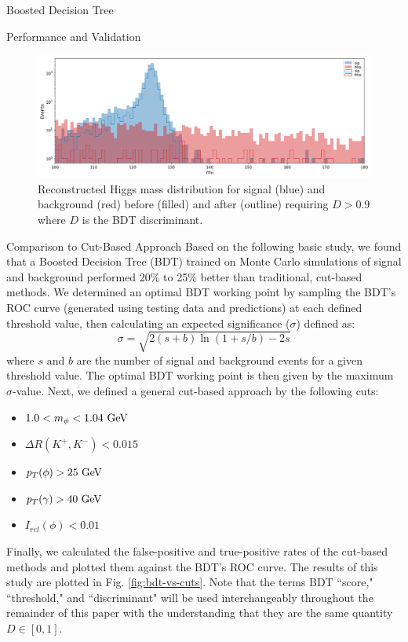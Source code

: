 \begin{section}{Boosted Decision Tree}
\begin{subsection}{Performance and Validation}
\begin{figure}[htb]
\begin{center}
\includegraphics[width=.95\linewidth]{Dissertation/fig/bdt-bkgsculpt2.png}
\end{center}
\caption{Reconstructed Higgs mass distribution for signal (blue) and background (red) before (filled) and after (outline) requiring $D > 0.9$ where $D$ is the BDT discriminant.}
\label{fig:bdt-bkgsculpt2}
\end{figure}
\end{subsection}
\begin{subsection}{Comparison to Cut-Based Approach}
Based on the following basic study, we found that a Boosted Decision Tree (BDT) trained on Monte Carlo simulations of signal and background performed 20\% to 25\% better than traditional, cut-based methods. We determined an optimal BDT working point by sampling the BDT's ROC curve (generated using testing data and predictions) at each defined threshold value, then calculating an expected significance ($\sigma$) defined as:
\begin{equation}\label{expsig-eq}
    \sigma = \sqrt{2(s+b)\ln(1+s/b)-2s}
\end{equation}
\noindent where $s$ and $b$ are the number of signal and background events for a given threshold value. The optimal BDT working point is then given by the maximum $\sigma$-value. Next, we defined a general cut-based approach by the following cuts:
\begin{itemize}
    \item $1.0 < m_{\phi} < 1.04\textnormal{ GeV}$
    \item $\Delta R(K^{+}, K^{-}) < 0.015$
    \item $p_{T}(\phi) > 25\textnormal{ GeV}$
    \item $p_{T}(\gamma) > 40\textnormal{ GeV}$
    \item $I_{rel}(\phi) < 0.01$
\end{itemize}
\noindent Finally, we calculated the false-positive and true-positive rates of the cut-based methods and plotted them against the BDT's ROC curve. The results of this study are plotted in Fig. \ref{fig:bdt-vs-cuts}. Note that the terms BDT ``score," ``threshold," and ``discriminant" will be used interchangeably throughout the remainder of this paper with the understanding that they are the same quantity $D \in [0,1]$.


\end{subsection}
\end{section}
